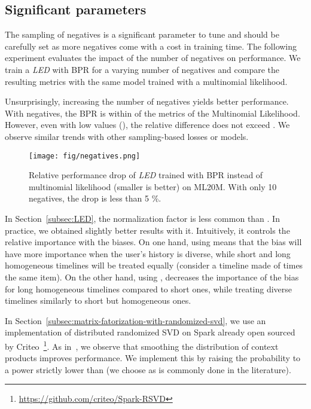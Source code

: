 \documentclass[sigconf]{acmart}
\begin{document}
\subsection{Significant parameters}

The sampling of negatives is a significant parameter to tune and should be carefully set as more negatives come with a cost in training time. The following experiment evaluates the impact of the number of negatives on performance. We train a \emph{LED} with BPR for a varying number of negatives and compare the resulting metrics with the same model trained with a multinomial likelihood. 

Unsurprisingly, increasing the number of negatives yields better performance. With  negatives, the BPR is within  of the metrics of the Multinomial Likelihood. However, even with low values (), the relative difference does not exceed . We observe similar trends with other sampling-based losses or models.

\begin{figure}[h!]
    \centering
    \texttt{[image: fig/negatives.png]}
    \caption{Relative performance drop of \emph{LED} trained with BPR instead of multinomial likelihood (smaller is better) on ML20M. With only 10 negatives, the drop is less than 5 \%.}
    \label{fig:num-negatives}
\end{figure}

In Section~\ref{subsec:LED}, the normalization factor  is less common than . In practice, we obtained slightly better results with it. Intuitively, it controls the relative importance with the biases. On one hand, using  means that the bias will have more importance when the user's history is diverse, while short and long homogeneous timelines will be treated equally (consider a timeline made of  times the same item). On the other hand, using , decreases the importance of the bias for long homogeneous timelines compared to short ones, while treating diverse timelines similarly to short but homogeneous ones.

In Section~\ref{subsec:matrix-fatorization-with-randomized-svd}, we use an implementation of distributed randomized SVD on Spark already open sourced by Criteo~\footnote{\url{https://github.com/criteo/Spark-RSVD}}. As in~\cite{levy2015improving}, we observe that smoothing the distribution of context products improves performance. We implement this by raising the probability  to a power strictly lower than  (we choose  as is commonly done in the literature).
\end{document}
